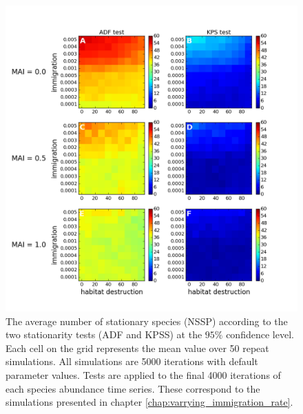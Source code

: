 \begin{figure}[hp]
	\centering
	\includegraphics[width=1.0\linewidth]{"./chapters/chapter04b/figures/nssp_ir_v_hl"}
    \caption{The average number of stationary species (NSSP) according to the two stationarity tests (ADF and KPSS) at the $95\%$ confidence level. Each cell on the grid represents the mean value over 50 repeat simulations. All simulations are 5000 iterations with default parameter values. Tests are applied to the final 4000 iterations of each species abundance time series. These correspond to the simulations presented in chapter \ref{chap:varrying_immigration_rate}.}
    \label{fig:nssp_ir_v_hl}
\end{figure}



